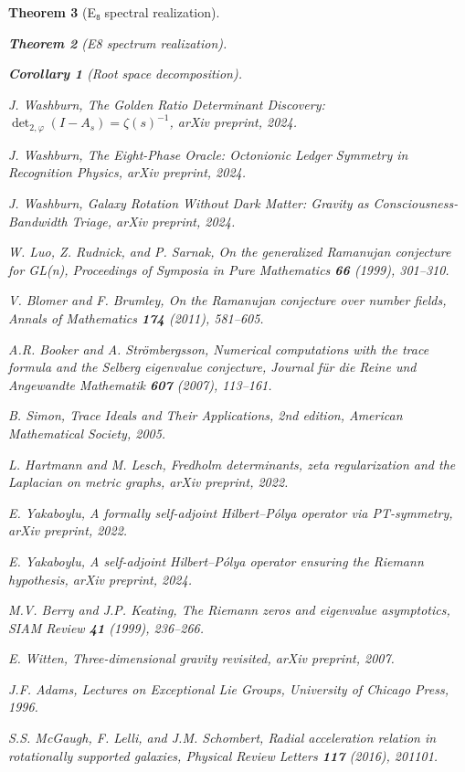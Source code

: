 \documentclass[11pt,a4paper]{article}
\newtheorem{theorem}{Theorem}[section]
\newtheorem{corollary}[theorem]{Corollary}
\theoremstyle{definition}
\theoremstyle{remark}
\begin{document}
\begin{theorem}[E₈ spectral realization]
\begin{theorem}[E8 spectrum realization]
\begin{enumerate}
\begin{corollary}[Root space decomposition]
\begin{thebibliography}{99}
J. Washburn,
\emph{The Golden Ratio Determinant Discovery: $\det_{2,\varphi}(I - A_s) = \zeta(s)^{-1}$},
arXiv preprint, 2024.

J. Washburn,
\emph{The Eight-Phase Oracle: Octonionic Ledger Symmetry in Recognition Physics},
arXiv preprint, 2024.

J. Washburn,
\emph{Galaxy Rotation Without Dark Matter: Gravity as Consciousness-Bandwidth Triage},
arXiv preprint, 2024.

W. Luo, Z. Rudnick, and P. Sarnak,
\emph{On the generalized Ramanujan conjecture for GL(n)},
Proceedings of Symposia in Pure Mathematics \textbf{66} (1999), 301--310.

V. Blomer and F. Brumley,
\emph{On the Ramanujan conjecture over number fields},
Annals of Mathematics \textbf{174} (2011), 581--605.

A.R. Booker and A. Str\"ombergsson,
\emph{Numerical computations with the trace formula and the Selberg eigenvalue conjecture},
Journal f\"ur die Reine und Angewandte Mathematik \textbf{607} (2007), 113--161.

B. Simon,
\emph{Trace Ideals and Their Applications}, 2nd edition,
American Mathematical Society, 2005.

L. Hartmann and M. Lesch,
\emph{Fredholm determinants, zeta regularization and the Laplacian on metric graphs},
arXiv preprint, 2022.

E. Yakaboylu,
\emph{A formally self-adjoint Hilbert--P\'olya operator via PT-symmetry},
arXiv preprint, 2022.

E. Yakaboylu,
\emph{A self-adjoint Hilbert--P\'olya operator ensuring the Riemann hypothesis},
arXiv preprint, 2024.

M.V. Berry and J.P. Keating,
\emph{The Riemann zeros and eigenvalue asymptotics},
SIAM Review \textbf{41} (1999), 236--266.

E. Witten,
\emph{Three-dimensional gravity revisited},
arXiv preprint, 2007.

J.F. Adams,
\emph{Lectures on Exceptional Lie Groups},
University of Chicago Press, 1996.

S.S. McGaugh, F. Lelli, and J.M. Schombert,
\emph{Radial acceleration relation in rotationally supported galaxies},
Physical Review Letters \textbf{117} (2016), 201101.


\end{thebibliography}
\end{corollary}
\end{enumerate}
\end{theorem}
\end{theorem}
\end{document}
